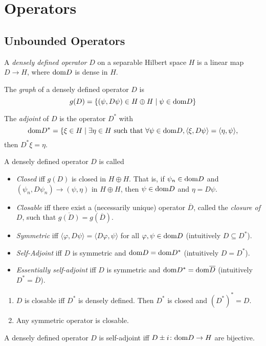 
\section{Operators}
\subsection{Unbounded Operators}
\begin{definition}
 A \emph{densely defined operator} $D$ on a separable Hilbert space $H$ is a linear map $D\to H$, where $\mathrm{dom} D$ is dense in $H$.
\end{definition}

\begin{definition}
 The \emph{graph} of a densely defined operator $D$ is $$g(D)=\{(\psi,D\psi)\in H\oplus H\mid\psi\in\mathrm{dom} D\}$$
\end{definition}

\begin{definition}
 The \emph{adjoint} of $D$ is the operator $D^\ast$ with $$\mathrm{dom} D^\ast=\{\xi\in H\mid \exists\eta\in H\text{ such that }\forall\psi\in\mathrm{dom} D, \langle\xi, D\psi\rangle=\langle\eta,\psi\rangle,$$
 then $D^\ast\xi=\eta$.
\end{definition}

\begin{definition}
 A densely defined operator $D$ is called
 \begin{itemize}
  \item \emph{Closed} iff $g(D)$ is closed in $H\oplus H$. That is, if $\psi_n\in\mathrm{dom} D$ and $(\psi_n,D\psi_n)\to(\psi,\eta)$ in $H\oplus H$, then $\psi\in\mathrm{dom} D$ and $\eta=D\psi$.
  \item \emph{Closable} iff there exist a (necessarily unique) operator $\overline{D}$, called the \emph{closure of $D$}, such that $\overline{g(D)}=g(\overline{D})$.
  \item \emph{Symmetric} iff $\langle\varphi, D\psi\rangle=\langle D\varphi,\psi\rangle$ for all $\varphi,\psi\in\mathrm{dom} D$ (intuitively $D\subseteq D^\ast$).
  \item \emph{Self-Adjoint} iff $D$ is symmetric and $\mathrm{dom} D=\mathrm{dom} D^\ast$ (intuitively $D=D^\ast$).
  \item \emph{Essentially self-adjoint} iff $D$ is symmetric and $\mathrm{dom} D^\ast=\mathrm{dom}\overline{D}$ (intuitively $D^\ast=\overline{D}$).
 \end{itemize}
\end{definition}
\begin{fact}\noindent 
 \begin{enumerate}
  \item $D$ is closable iff $D^\ast$ is densely defined. Then $D^\ast$ is closed and $(D^\ast)^\ast=D$.
  \item Any symmetric operator is closable.
 \end{enumerate}
\end{fact}
\begin{theorem}
 A densely defined operator $D$ is self-adjoint iff $D\pm i\colon\mathrm{dom} D\to H$ are bijective.
\end{theorem}

